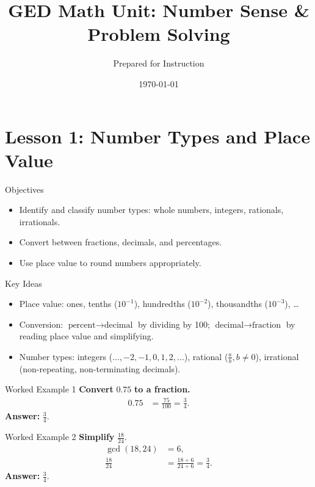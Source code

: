 \documentclass[aspectratio=169]{beamer}
\title{GED Math Unit: Number Sense \& Problem Solving}
\author{Prepared for Instruction}
\date{\today}
\begin{document}
\begin{frame}
  \titlepage
\end{frame}



\section{Lesson 1: Number Types and Place Value}

\begin{frame}{Objectives}
\begin{itemize}
  \item Identify and classify number types: whole numbers, integers, rationals, irrationals.
  \item Convert between fractions, decimals, and percentages.
  \item Use place value to round numbers appropriately.
\end{itemize}
\end{frame}

\begin{frame}{Key Ideas}
\begin{itemize}
  \item Place value: ones, tenths ($10^{-1}$), hundredths ($10^{-2}$), thousandths ($10^{-3}$), \dots
  \item Conversion: \(\text{percent} \to \text{decimal}\) by dividing by 100; \(\text{decimal} \to \text{fraction}\) by reading place value and simplifying.
  \item Number types: integers ($\dots,-2,-1,0,1,2,\dots$), rational (\(\frac{a}{b}, b\neq 0\)), irrational (non-repeating, non-terminating decimals).
\end{itemize}
\end{frame}

\begin{frame}{Worked Example 1}
\textbf{Convert } \(0.75\) \textbf{ to a fraction.}
\begin{align*}
0.75 &= \frac{75}{100} = \frac{3}{4}.
\end{align*}
\textbf{Answer: } \(\frac{3}{4}\).
\end{frame}

\begin{frame}{Worked Example 2}
\textbf{Simplify } \(\frac{18}{24}\).
\begin{align*}
\gcd(18,24) &= 6, \\
\frac{18}{24} &= \frac{18\div 6}{24\div 6} = \frac{3}{4}.
\end{align*}
\textbf{Answer: } \(\frac{3}{4}\).
\end{frame}
\end{document}
